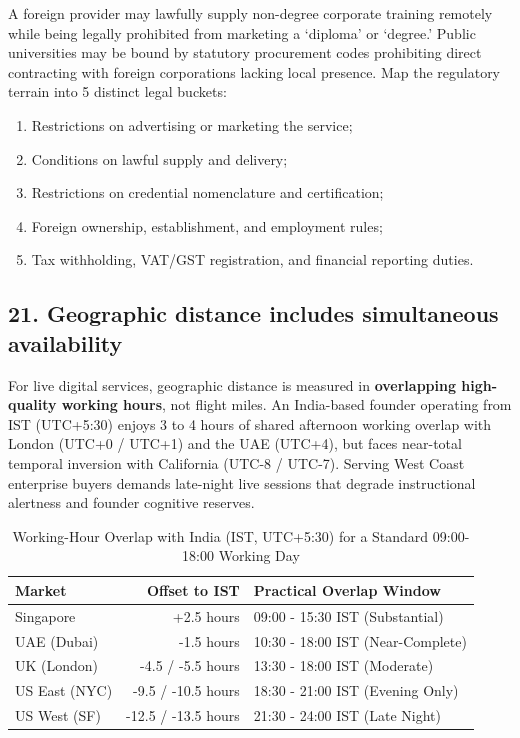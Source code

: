 A foreign provider may lawfully supply non-degree corporate training remotely while being legally prohibited from marketing a `diploma' or `degree.' Public universities may be bound by statutory procurement codes prohibiting direct contracting with foreign corporations lacking local presence. Map the regulatory terrain into 5 distinct legal buckets:
\begin{enumerate}
    \item Restrictions on advertising or marketing the service;
    \item Conditions on lawful supply and delivery;
    \item Restrictions on credential nomenclature and certification;
    \item Foreign ownership, establishment, and employment rules;
    \item Tax withholding, VAT/GST registration, and financial reporting duties.
\end{enumerate}

\subsection{21. Geographic distance includes simultaneous availability}

For live digital services, geographic distance is measured in \textbf{overlapping high-quality working hours}, not flight miles. An India-based founder operating from IST (UTC+5:30) enjoys 3 to 4 hours of shared afternoon working overlap with London (UTC+0 / UTC+1) and the UAE (UTC+4), but faces near-total temporal inversion with California (UTC-8 / UTC-7). Serving West Coast enterprise buyers demands late-night live sessions that degrade instructional alertness and founder cognitive reserves.

\begin{table}[htbp]
\centering
\small
\caption{Working-Hour Overlap with India (IST, UTC+5:30) for a Standard 09:00-18:00 Working Day}
\label{tab:time_overlap}
\begin{tabularx}{\columnwidth}{l r X}
\toprule
\textbf{Market} & \textbf{Offset to IST} & \textbf{Practical Overlap Window} \\
\midrule
Singapore & +2.5 hours & 09:00 - 15:30 IST (Substantial) \\
UAE (Dubai) & -1.5 hours & 10:30 - 18:00 IST (Near-Complete) \\
UK (London) & -4.5 / -5.5 hours & 13:30 - 18:00 IST (Moderate) \\
US East (NYC) & -9.5 / -10.5 hours & 18:30 - 21:00 IST (Evening Only) \\
US West (SF) & -12.5 / -13.5 hours & 21:30 - 24:00 IST (Late Night) \\
\bottomrule
\end{tabularx}
\end{table}

